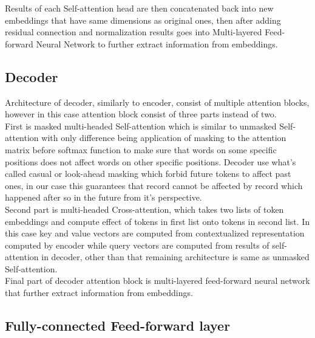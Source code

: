 Results of each Self-attention head are then concatenated back into new embeddings that have same dimensions as original ones, then after adding residual connection and normalization results goes into Multi-layered Feed-forward Neural Network to further extract information from embeddings.

\subsection{Decoder}

Architecture of decoder, similarly to encoder, consist of multiple attention blocks, however in this case attention block consist of three parts instead of two. 
\\

First is masked multi-headed Self-attention which is similar to unmasked Self-attention with only difference being application of masking to the attention matrix before softmax function to make sure that words on some specific positions does not affect words on other specific positions. Decoder use what's called casual or look-ahead masking which forbid future tokens to affect past ones, in our case this guarantees that record cannot be affected by record which happened after so in the future from it's perspective. 
\\

Second part is multi-headed Cross-attention, which takes two lists of token embeddings and compute effect of tokens in first list onto tokens in second list. In this case key and value vectors are computed from contextualized representation computed by encoder while query vectors are computed from results of self-attention in decoder, other than that remaining architecture is same as unmasked Self-attention. 
\\

Final part of decoder attention block is multi-layered feed-forward neural network that further extract information from embeddings. 

\subsection{Fully-connected Feed-forward layer}

